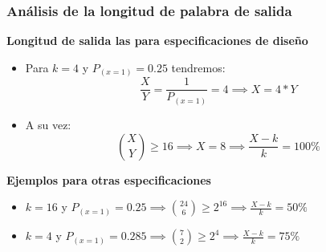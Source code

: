 \begin{frame}
  \frametitle{\textbf{Análisis de la longitud de palabra de salida}}
    \begin{block}{\centering \textbf{Longitud de salida las para especificaciones de diseño}}
    \begin{itemize}\Small
        \item Para $k=4$ y $P_{(x=1)} = 0.25$ tendremos:
            \begin{equation*}
            \frac{X}{Y} = \frac{1}{P_{(x=1)}} = 4 \implies X = 4*Y
            \end{equation*}
        \item A su vez:
            \begin{equation*} 
            {X \choose Y} \geq 16 \implies X=8 \implies \frac{X-k}{k} = 100\% 
            \end{equation*}
    \end{itemize}
    \end{block}
        \begin{block}{\centering \textbf{Ejemplos para otras especificaciones}}
        \begin{itemize}
        \item $k=16$ y $P_{(x=1)} = 0.25 \implies {24 \choose 6} \geq 2^{16} \implies \frac{X-k}{k} = 50\%$ 
        \item  $k=4$ y $P_{(x=1)} = 0.285 \implies {7 \choose 2} \geq 2^{4} \implies \frac{X-k}{k} = 75\%$
    \end{itemize}
    \end{block}
\end{frame}



